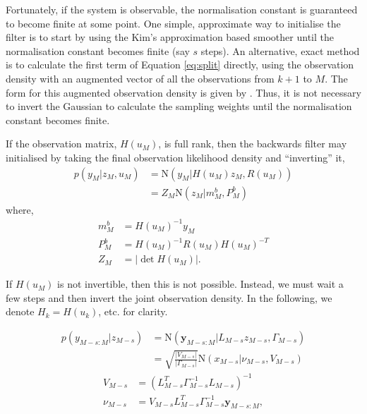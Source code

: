 \documentclass[twocolumn]{autart}    %
\begin{document}
Fortunately, if the system is observable, the normalisation constant is guaranteed to become finite at some point. One simple, approximate way to initialise the filter is to start by using the Kim's approximation based smoother until the normalisation constant becomes finite (say $s$ steps). An alternative, exact method is to calculate the first term of Equation \eqref{eq:split} directly, using the observation density with an augmented vector of all the observations from $k+1$ to $M$. The form for this augmented observation density is given by \cite{Kitagawa:1994}. Thus, it is not necessary to invert the Gaussian to calculate the sampling weights until the normalisation constant becomes finite.

If the observation matrix, $H(u_M)$, is full rank, then the backwards filter may initialised by taking the final observation likelihood density and ``inverting'' it,
%
\begin{equation}
\begin{split}
  p(y_M | z_M, u_M) &= \mathrm{N}( y_M | H(u_M) z_M , R(u_M) ) \\
  &= Z_M \mathrm{N}( z_M | m_M^b , P_M^b )
\end{split}
\end{equation}
%
where,
%
\begin{equation}
\begin{split}
  m_M^b &= H(u_M)^{-1} y_M \\
  P_M^b &= H(u_M)^{-1} R(u_M) H(u_M)^{-T} \\
  Z_M   &= |\det H(u_M)|     .
\end{split}
\end{equation}

If $H(u_M)$ is not invertible, then this is not possible. Instead, we must wait a few steps and then invert the joint observation density. In the following, we denote $H_k = H(u_k)$, etc. for clarity.

\begin{equation}
\begin{split}
 p(y_{M-s:M}|z_{M-s}) &= \mathrm{N}( \mathbf{y}_{M-s:M} | L_{M-s} z_{M-s}, \Gamma_{M-s} ) \\
 &= \sqrt{\frac{|V_{M-s}|}{|\Gamma_{M-s}|}} \mathrm{N}(x_{M-s} | \nu_{M-s}, V_{M-s} )
\end{split}
\end{equation}
\begin{equation}
\begin{split}
 V_{M-s} & = (L_{M-s}^T \Gamma_{M-s}^{-1} L_{M-s})^{-1} \\
 \nu_{M-s} & = V_{M-s} L_{M-s}^T \Gamma_{M-s}^{-1} \mathbf{y}_{M-s:M}     ,
\end{split}
\end{equation}
\end{document}
